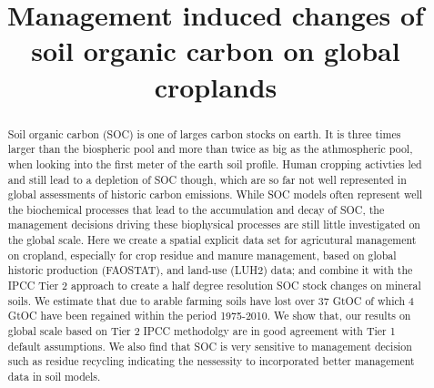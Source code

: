 \documentclass[gc, manuscript]{copernicus}
\begin{document}
\title{Management induced changes of soil organic carbon on global croplands}














\received{}
\pubdiscuss{} %
\revised{}
\accepted{}
\published{}




\maketitle


\begin{abstract}
Soil organic carbon (SOC) is one of larges carbon stocks on earth. It is three times larger than the biospheric pool and more than twice as big as the athmospheric pool, when looking into the first meter of the earth soil profile. Human cropping activties led and still lead to a depletion of SOC though, which are so far not well represented in global assessments of historic carbon emissions. While SOC models often represent well the biochemical processes that lead to the accumulation and decay of SOC, the management decisions driving these biophysical processes are still little investigated on the global scale. Here we create a spatial explicit data set for agricutural management on cropland, especially for crop residue and manure management, based on global historic production (FAOSTAT), and land-use (LUH2) data; and combine it with the IPCC Tier 2 approach to create a half degree resolution SOC stock changes on mineral soils. We estimate that due to arable farming soils have lost over 37 GtOC of which 4 GtOC have been regained within the period 1975-2010. We show that, our results on global scale based on Tier 2 IPCC methodolgy are in good agreement with Tier 1 default assumptions. We also find that SOC is very sensitive to management decision such as residue recycling indicating the nessessity to incorporated better management data in soil models.
\end{abstract}
\end{document}
